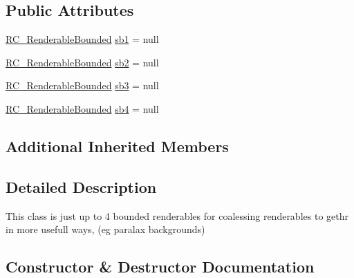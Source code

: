 \subsection*{Public Attributes}
\begin{DoxyCompactItemize}
\item 
\mbox{\hyperlink{class_r_c___framework_1_1_r_c___renderable_bounded}{R\+C\+\_\+\+Renderable\+Bounded}} \mbox{\hyperlink{class_r_c___framework_1_1_multi_renderable_a362c7065ca22231b1b4fddc581b839e5}{sb1}} = null
\item 
\mbox{\hyperlink{class_r_c___framework_1_1_r_c___renderable_bounded}{R\+C\+\_\+\+Renderable\+Bounded}} \mbox{\hyperlink{class_r_c___framework_1_1_multi_renderable_af0f44a3fc8d4c18fcadbeac11b9eec17}{sb2}} = null
\item 
\mbox{\hyperlink{class_r_c___framework_1_1_r_c___renderable_bounded}{R\+C\+\_\+\+Renderable\+Bounded}} \mbox{\hyperlink{class_r_c___framework_1_1_multi_renderable_ab8aacac69926e1ac7746ddcfcf32b604}{sb3}} = null
\item 
\mbox{\hyperlink{class_r_c___framework_1_1_r_c___renderable_bounded}{R\+C\+\_\+\+Renderable\+Bounded}} \mbox{\hyperlink{class_r_c___framework_1_1_multi_renderable_a24b67c770fadae584a5d0890f5cef70b}{sb4}} = null
\end{DoxyCompactItemize}
\subsection*{Additional Inherited Members}


\subsection{Detailed Description}
This class is just up to 4 bounded renderables for coalessing renderables to gethr in more usefull ways, (eg paralax backgrounds) 

\subsection{Constructor \& Destructor Documentation}
\mbox{\label{class_r_c___framework_1_1_multi_renderable_a86a299bbcb99c632f2b123a100fa9eef}} 
